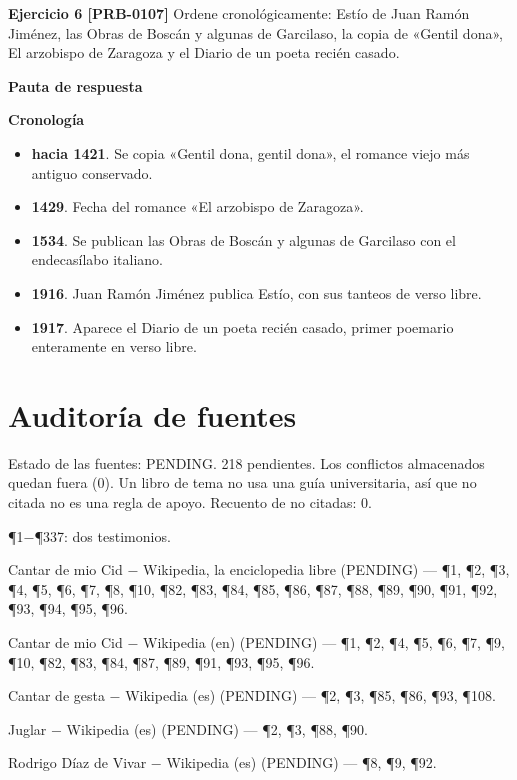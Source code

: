\documentclass{book}
\begin{document}
\noindent\textbf{Ejercicio 6 [PRB-0107]}
Ordene cronológicamente: Estío de Juan Ramón Jiménez, las Obras de Boscán y algunas de Garcilaso, la copia de «Gentil dona», El arzobispo de Zaragoza y el Diario de un poeta recién casado.


\noindent\textbf{Pauta de respuesta}

\noindent\textbf{Cronología}
\begin{itemize}
\item \textbf{hacia 1421}. Se copia «Gentil dona, gentil dona», el romance viejo más antiguo conservado.
\item \textbf{1429}. Fecha del romance «El arzobispo de Zaragoza».
\item \textbf{1534}. Se publican las Obras de Boscán y algunas de Garcilaso con el endecasílabo italiano.
\item \textbf{1916}. Juan Ramón Jiménez publica Estío, con sus tanteos de verso libre.
\item \textbf{1917}. Aparece el Diario de un poeta recién casado, primer poemario enteramente en verso libre.
\end{itemize}
\chapter{Auditoría de fuentes}

\noindent Estado de las fuentes: PENDING. 218 pendientes. Los conflictos almacenados quedan fuera (0). Un libro de tema no usa una guía universitaria, así que no citada no es una regla de apoyo. Recuento de no citadas: 0.

\noindent ¶1\(-\)¶337: dos testimonios.

\medskip

\noindent Cantar de mio Cid \(-\) Wikipedia, la enciclopedia libre (PENDING) --- \P1, \P2, \P3, \P4, \P5, \P6, \P7, \P8, \P10, \P82, \P83, \P84, \P85, \P86, \P87, \P88, \P89, \P90, \P91, \P92, \P93, \P94, \P95, \P96.

\noindent Cantar de mio Cid \(-\) Wikipedia (en) (PENDING) --- \P1, \P2, \P4, \P5, \P6, \P7, \P9, \P10, \P82, \P83, \P84, \P87, \P89, \P91, \P93, \P95, \P96.

\noindent Cantar de gesta \(-\) Wikipedia (es) (PENDING) --- \P2, \P3, \P85, \P86, \P93, \P108.

\noindent Juglar \(-\) Wikipedia (es) (PENDING) --- \P2, \P3, \P88, \P90.

\noindent Rodrigo Díaz de Vivar \(-\) Wikipedia (es) (PENDING) --- \P8, \P9, \P92.
\end{document}
